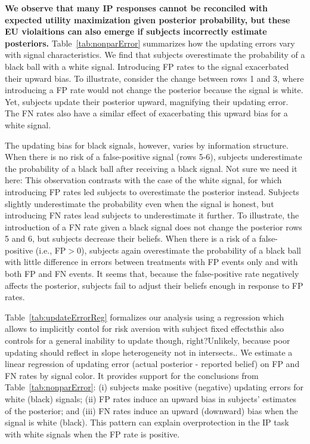\documentclass[12pt,a4paper]{article}
\newcommand{\aut}[1]{{\color{Red}#1}}
\newcommand{\pmt}[1]{{\color{Blue}#1}}
\begin{document}
\textbf{We observe that many IP responses cannot be reconciled with expected utility maximization given posterior probability, but these EU violaitions can also emerge if subjects incorrectly estimate posteriors.} Table~\ref{tab:nonparError} summarizes how the updating errors vary with signal characteristics. We find that subjects overestimate the probability of a black ball with a white signal. Introducing FP rates to the signal exacerbated their upward bias. To illustrate, consider the change between rows 1 and 3, where introducing a FP rate would not change the posterior because the signal is white. Yet, subjects update their posterior upward, magnifying their updating error. The FN rates also have a similar effect of exacerbating this upward bias for a white signal.

The updating bias for black signals, however, varies by information structure. When there is no risk of a false-positive signal (rows 5-6), subjects underestimate the probability of a black ball after receiving a black signal. \aut{Not sure we need it here: This observation contrasts with the case of the white signal, for which introducing FP rates led subjects to overestimate the posterior instead.} Subjects slightly underestimate the probability even when the signal is honest, but introducing FN rates lead subjects to underestimate it further. To illustrate, the introduction of a FN rate given a black signal does not change the posterior rows 5 and 6, but subjects decrease their beliefs. When there is a risk of a false-positive (i.e., FP$>$0), subjects again overestimate the probability of a black ball with little difference in errors between treatments with FP events only and with both FP and FN events. It seems that, because the false-positive rate negatively affects the posterior, subjects fail to adjust their beliefs enough in response to FP rates.

Table~\ref{tab:updateErrorReg} formalizes our analysis using a regression which allows to implicitly contol for risk aversion with subject fixed effects\pmt{this also controls for a general inability to update though, right?}\aut{Unlikely, because poor updating should reflect in slope heterogeneity not in intersects.}. We estimate a linear regression of updating error (actual posterior - reported belief) on FP and FN rates by signal color. It provides support for the conclusions from Table~\ref{tab:nonparError}: (i) subjects make positive (negative) updating errors for white (black) signals; (ii) FP rates induce an upward bias in subjects' estimates of the posterior; and (iii) FN rates induce an upward (downward) bias when the signal is white (black). This pattern can explain overprotection in the IP task with white signals when the FP rate is positive.
\end{document}
